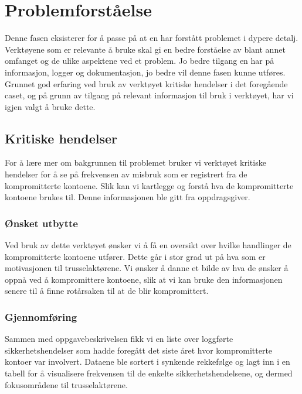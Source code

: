 \chapter{Problemforståelse}
Denne fasen eksisterer for å passe på at en har forstått problemet i dypere detalj. Verktøyene som er relevante å bruke skal gi en bedre forståelse av blant annet omfanget og de ulike aspektene ved et problem. Jo bedre tilgang en har på informasjon, logger og dokumentasjon, jo bedre vil denne fasen kunne utføres. Grunnet god erfaring ved bruk av verktøyet kritiske hendelser i det foregående caset, og på grunn av tilgang på relevant informasjon til bruk i verktøyet, har vi igjen valgt å bruke dette. 


\section{Kritiske hendelser}
For å lære mer om bakgrunnen til problemet bruker vi verktøyet kritiske hendelser for å se på frekvensen av misbruk som er registrert fra de kompromitterte kontoene. Slik kan vi kartlegge og forstå hva de kompromitterte kontoene brukes til. Denne informasjonen ble gitt fra oppdragsgiver.

\subsection{Ønsket utbytte}
Ved bruk av dette verktøyet ønsker vi å få en oversikt over hvilke handlinger de kompromitterte kontoene utfører. Dette går i stor grad ut på hva som er motivasjonen til trusselaktørene. Vi ønsker å danne et bilde av hva de ønsker å oppnå ved å kompromittere kontoene, slik at vi kan bruke den informasjonen senere til å finne rotårsaken til at de blir kompromittert. 

\subsection{Gjennomføring}
Sammen med oppgavebeskrivelsen fikk vi en liste over loggførte sikkerhetshendelser som hadde foregått det siste året hvor kompromitterte kontoer var involvert. Dataene ble sortert i synkende rekkefølge og lagt inn i en tabell for å visualisere frekvensen til de enkelte sikkerhetshendelsene, og dermed fokusområdene til trusselaktørene. 

